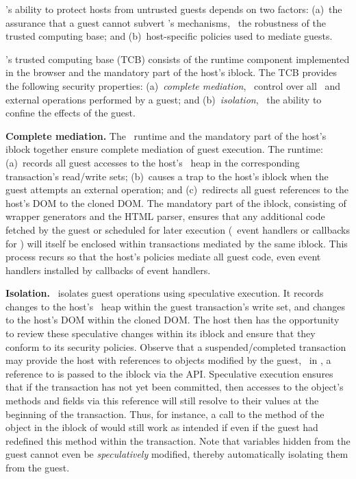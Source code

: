 \label{section:analysis}
%
\txjs's ability to protect hosts from untrusted guests depends on two factors:
(a)~the assurance that a guest cannot subvert \txjs's mechanisms, \ie~the
robustness of the trusted computing base; and (b)~host-specific policies used to
mediate guests. 

\label{section:analysis:tcb}

\txjs's trusted computing base (TCB) consists of the runtime component
implemented in the browser and the mandatory part of the host's iblock. The TCB
provides the following security properties: (a)~\textit{complete mediation},
\ie~control over all \js\ and external operations performed by a guest; and
(b)~\textit{isolation}, \ie~the ability to confine the effects of the guest. 

\begin{mylist}
%
\item \textbf{Complete mediation.} The \txjs\ runtime and the mandatory part of
the host's iblock together ensure complete mediation of guest execution. The
runtime: (a)~records all guest accesses to the host's \js\ heap in the
corresponding transaction's read/write sets; (b)~causes a trap to the host's
iblock when the guest attempts an external operation; and (c)~redirects all
guest references to the host's DOM to the cloned DOM. The mandatory part of the
iblock, consisting of wrapper generators and the HTML parser, ensures that any
additional code fetched by the guest or scheduled for later execution
(\eg~event handlers or callbacks for ) will itself be
enclosed within transactions mediated by the same iblock. This process recurs
so that the host's policies mediate all guest code, even event handlers
installed by callbacks of event handlers.

\item \textbf{Isolation.} \txjs\ isolates guest operations using speculative
execution. It records changes to the host's \js\ heap within the guest
transaction's write set, and changes to the host's DOM within the cloned DOM.
The host then has the opportunity to review these speculative changes within
its iblock and ensure that they conform to its security policies.  Observe that
a suspended/completed transaction may provide the host with references to
objects modified by the guest, \eg~in , a reference to
 is passed to the iblock via the  API. Speculative
execution ensures that if the transaction has not yet been committed, then
accesses to the object's methods and fields via this reference will still
resolve to their values at the beginning of the transaction.  Thus, for
instance, a call to the  method of the  object in the
iblock of  would still work as intended if even if the
guest had redefined this method within the transaction.  Note that variables
hidden from the guest cannot even be \textit{speculatively} modified, thereby
automatically isolating them from the guest.
%
\end{mylist}

